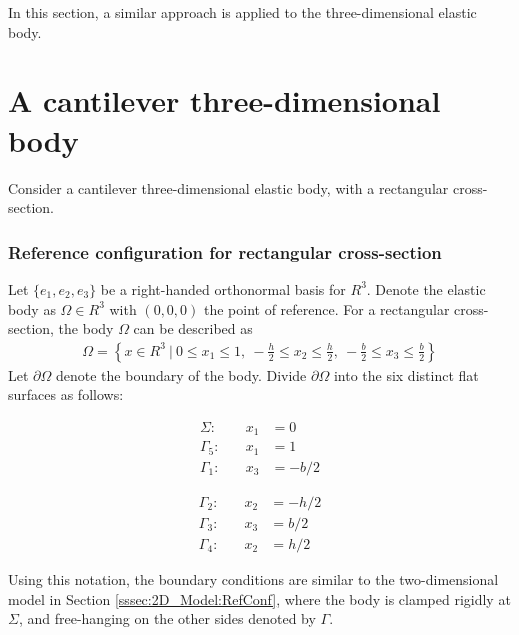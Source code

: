 \documentclass[../../main.tex]{subfiles}
\begin{document}
In this section, a similar approach is applied to the three-dimensional elastic body.


\section{A cantilever three-dimensional body}\label{sec:FEM:3D}
Consider a cantilever three-dimensional elastic body, with a rectangular cross-section.
 
\subsubsection{Reference configuration for rectangular cross-section}
Let $\{e_1,e_2,e_3\}$ be a right-handed orthonormal basis for $R^3$. Denote the elastic body as $\Omega \in R^3$ with $(0,0,0)$ the point of reference. For a rectangular cross-section, the body $\Omega$ can be described as
\begin{eqnarray*}
	\Omega = \left\{ x \in R^3 \ | \ 0 \leq x_1 \leq 1, \ -\frac{h}{2} \leq x_2 \leq \frac{h}{2} , \ -\frac{b}{2} \leq x_3 \leq \frac{b}{2}\right \}
\end{eqnarray*} \label{sym:width}
Let $\partial \Omega$ denote the boundary of the body. Divide $\partial \Omega$ into the six distinct flat surfaces as follows:

\noindent\begin{minipage}{.5\linewidth}
	\begin{eqnarray*}
		\Sigma:& \quad x_1 &= 0\\
		\Gamma_5:& \quad x_1 &= 1\\
		\Gamma_1:& \quad x_3 &= -{b}/{2} 
	\end{eqnarray*}
\end{minipage}%
\begin{minipage}{.5\linewidth}
	\begin{eqnarray*}
		\Gamma_2:& \quad x_2 &= -{h}/{2}\\
		\Gamma_3:& \quad x_3 &= {b}/{2}\\
		\Gamma_4:& \quad x_2 &= {h}/{2} 
	\end{eqnarray*}
\end{minipage}

Using this notation, the boundary conditions are similar to the two-dimensional model in Section \ref{sssec:2D_Model:RefConf}, where the body is clamped rigidly at $\Sigma$, and free-hanging on the other sides denoted by $\Gamma$.
\end{document}
